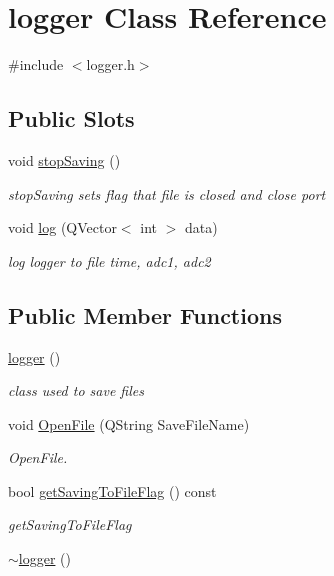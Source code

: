 \hypertarget{classlogger}{}\section{logger Class Reference}
\label{classlogger}


{\ttfamily \#include $<$logger.\+h$>$}

\subsection*{Public Slots}
\begin{DoxyCompactItemize}
\item 
void \hyperlink{classlogger_a6061365f51872f2f269568a8243dc284}{stop\+Saving} ()
\begin{DoxyCompactList}\small\item\em stop\+Saving sets flag that file is closed and close port \end{DoxyCompactList}\item 
void \hyperlink{classlogger_abfe4ff2446577ad695e9fed3fb3aec52}{log} (Q\+Vector$<$ int $>$ data)
\begin{DoxyCompactList}\small\item\em log logger to file time, adc1, adc2 \end{DoxyCompactList}\end{DoxyCompactItemize}
\subsection*{Public Member Functions}
\begin{DoxyCompactItemize}
\item 
\hyperlink{classlogger_a4f753a510e00c892b38e95c2284363a6}{logger} ()
\begin{DoxyCompactList}\small\item\em class used to save files \end{DoxyCompactList}\item 
void \hyperlink{classlogger_aa50d85f779b5f28f67dab8ab6a215ad8}{Open\+File} (Q\+String Save\+File\+Name)
\begin{DoxyCompactList}\small\item\em Open\+File. \end{DoxyCompactList}\item 
bool \hyperlink{classlogger_a1e070c45351986c87fe9c697b149de8d}{get\+Saving\+To\+File\+Flag} () const
\begin{DoxyCompactList}\small\item\em get\+Saving\+To\+File\+Flag \end{DoxyCompactList}\item 
\hyperlink{classlogger_aadd537feeeb16186f6aeb4ca0267a8d7}{$\sim$logger} ()
\end{DoxyCompactItemize}


